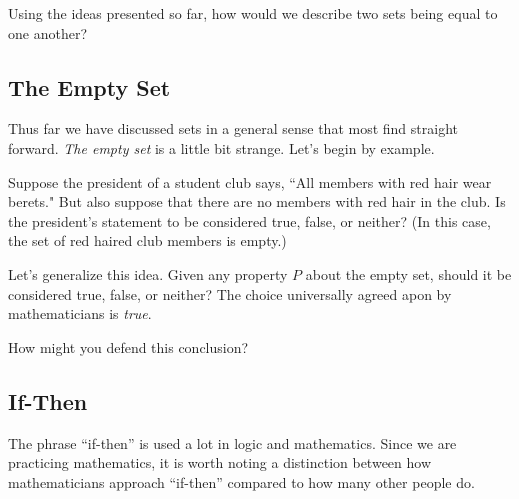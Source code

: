\begin{problem}
Using the ideas presented so far, how would we describe two sets being equal to one another?
\vspace{1em}


\end{problem}

\subsection*{The Empty Set}
Thus far we have discussed sets in a general sense that most find straight forward.  \emph{The empty set} is a little bit strange.  Let's begin by example.

\begin{example}
Suppose the president of a student club says, ``All members with red hair wear berets." But also suppose that there are no members with red hair in the club.  Is the president's statement to be considered true, false, or neither?  (In this case, the set of red haired club members is empty.)

\vspace{1em}
\end{example}

\begin{problem}
Let's generalize this idea.  Given any property $P$ about the empty set, should it be considered true, false, or neither?  The choice universally agreed apon by mathematicians is \emph{true}.

How might you defend this conclusion?

\vspace{1em}

\end{problem}


\subsection*{If-Then}

The phrase ``if-then'' is used a lot in logic and mathematics.  Since we are practicing mathematics, it is worth noting a distinction between how mathematicians approach ``if-then'' compared to how many other people do.

